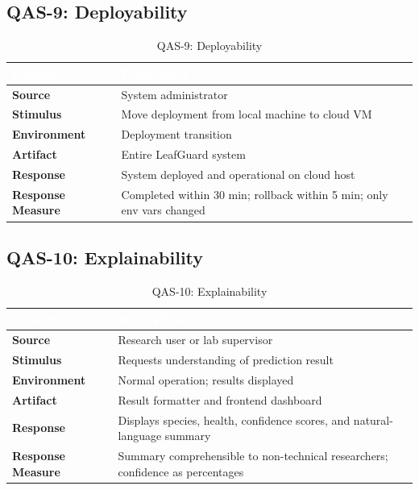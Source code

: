 \documentclass[11pt,a4paper,oneside]{report}
\begin{document}
\subsection{QAS-9: Deployability}
\begin{table}[H]
\centering\footnotesize
\caption{QAS-9: Deployability}
\label{tab:qas-deploy}
\begin{tabularx}{\textwidth}{>{\bfseries}p{2.5cm} X}
\toprule
\rowcolor{tableheader}
\textcolor{white}{Element} & \textcolor{white}{Description} \\
\midrule
Source          & System administrator \\
Stimulus        & Move deployment from local machine to cloud VM \\
Environment     & Deployment transition \\
Artifact        & Entire LeafGuard system \\
Response        & System deployed and operational on cloud host \\
Response Measure & Completed within 30 min; rollback within 5 min; only env vars changed \\
\bottomrule
\end{tabularx}
\end{table}

\subsection{QAS-10: Explainability}
\begin{table}[H]
\centering\footnotesize
\caption{QAS-10: Explainability}
\label{tab:qas-explain}
\begin{tabularx}{\textwidth}{>{\bfseries}p{2.5cm} X}
\toprule
\rowcolor{tableheader}
\textcolor{white}{Element} & \textcolor{white}{Description} \\
\midrule
Source          & Research user or lab supervisor \\
Stimulus        & Requests understanding of prediction result \\
Environment     & Normal operation; results displayed \\
Artifact        & Result formatter and frontend dashboard \\
Response        & Displays species, health, confidence scores, and natural-language summary \\
Response Measure & Summary comprehensible to non-technical researchers; confidence as percentages \\
\bottomrule
\end{tabularx}
\end{table}
\end{document}
